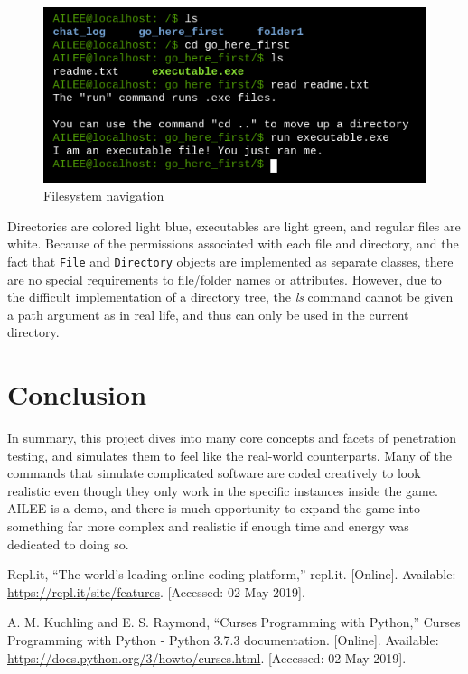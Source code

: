 \documentclass[conference]{IEEEtran}
\begin{document}
\begin{figure}[htbp]
	\centerline{\includegraphics[scale=2]{filesystem-example}}
	\caption{Filesystem navigation}
	\label{fig:ls-command}
\end{figure}

Directories are colored light blue, executables are light green, and regular files are white.  Because of the permissions associated with each file and directory, and the fact that \texttt{File} and \texttt{Directory} objects are implemented as separate classes, there are no special requirements to file/folder names or attributes.  However, due to the difficult implementation of a directory tree, the \textit{ls} command cannot be given a path argument as in real life, and thus can only be used in the current directory.

\section{Conclusion}
In summary, this project dives into many core concepts and facets of penetration testing, and simulates them to feel like the real-world counterparts. Many of the commands that simulate complicated software are coded creatively to look realistic even though they only work in the specific instances inside the game. AILEE is a demo, and there is much opportunity to expand the game into something far more complex and realistic if enough time and energy was dedicated to doing so.

\begin{thebibliography}{00}
 Repl.it, ``The world's leading online coding platform,'' repl.it. [Online]. Available: \url{https://repl.it/site/features}. [Accessed: 02-May-2019].

 A. M. Kuchling and E. S. Raymond, ``Curses Programming with Python,'' Curses Programming with Python - Python 3.7.3 documentation. [Online]. Available: \url{https://docs.python.org/3/howto/curses.html}. [Accessed: 02-May-2019].
\end{thebibliography}
\end{document}
